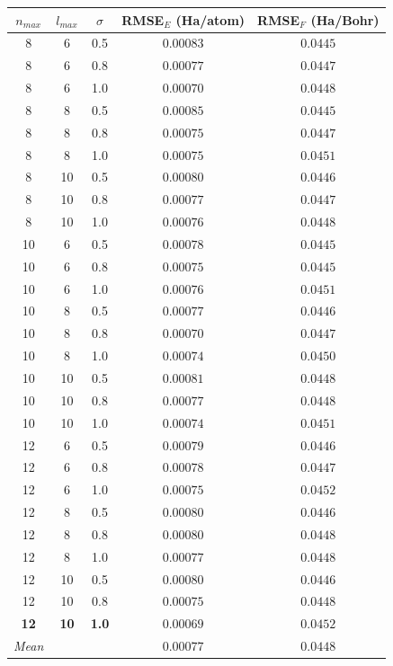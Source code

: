 \begin{tabular}{ccccc}
\toprule
$n_{max}$ & $l_{max}$ & $\sigma$ & RMSE$_E$ (Ha/atom) & RMSE$_F$ (Ha/Bohr) \\
\midrule
8 & 6 & 0.5 & $0.00083$ & $0.0445$ \\
8 & 6 & 0.8 & $0.00077$ & $0.0447$ \\
8 & 6 & 1.0 & $0.00070$ & $0.0448$ \\
8 & 8 & 0.5 & $0.00085$ & $0.0445$ \\
8 & 8 & 0.8 & $0.00075$ & $0.0447$ \\
8 & 8 & 1.0 & $0.00075$ & $0.0451$ \\
8 & 10 & 0.5 & $0.00080$ & $0.0446$ \\
8 & 10 & 0.8 & $0.00077$ & $0.0447$ \\
8 & 10 & 1.0 & $0.00076$ & $0.0448$ \\
10 & 6 & 0.5 & $0.00078$ & $0.0445$ \\
10 & 6 & 0.8 & $0.00075$ & $0.0445$ \\
10 & 6 & 1.0 & $0.00076$ & $0.0451$ \\
10 & 8 & 0.5 & $0.00077$ & $0.0446$ \\
10 & 8 & 0.8 & $0.00070$ & $0.0447$ \\
10 & 8 & 1.0 & $0.00074$ & $0.0450$ \\
10 & 10 & 0.5 & $0.00081$ & $0.0448$ \\
10 & 10 & 0.8 & $0.00077$ & $0.0448$ \\
10 & 10 & 1.0 & $0.00074$ & $0.0451$ \\
12 & 6 & 0.5 & $0.00079$ & $0.0446$ \\
12 & 6 & 0.8 & $0.00078$ & $0.0447$ \\
12 & 6 & 1.0 & $0.00075$ & $0.0452$ \\
12 & 8 & 0.5 & $0.00080$ & $0.0446$ \\
12 & 8 & 0.8 & $0.00080$ & $0.0448$ \\
12 & 8 & 1.0 & $0.00077$ & $0.0448$ \\
12 & 10 & 0.5 & $0.00080$ & $0.0446$ \\
12 & 10 & 0.8 & $0.00075$ & $0.0448$ \\
\textbf{12} & \textbf{10} & \textbf{1.0} & \textbf{$0.00069$} & \textbf{$0.0452$} \\
\midrule
\textit{Mean} & & & \textit{$0.00077$} & \textit{$0.0448$} \\
\bottomrule
\end{tabular}
